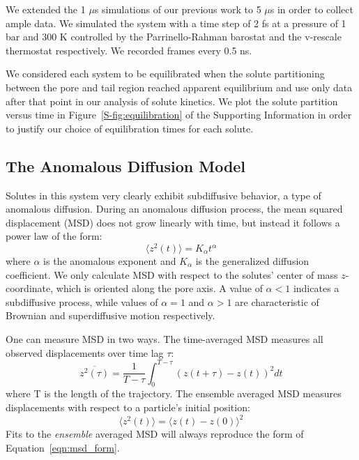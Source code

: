 \documentclass[12pt]{article}
\begin{document}
  We extended the 1 $\mu$s simulations of our previous work to 5 $\mu$s in order
  to collect ample data. We simulated the system with a time step of 2 fs at a pressure
  of 1 bar and 300 K controlled by the Parrinello-Rahman barostat and the v-rescale 
  thermostat respectively. We recorded frames every 0.5 ns.
  
  We considered each system to be equilibrated when the solute partitioning between the 
  pore and tail region reached apparent equilibrium and use only data after that point
  in our analysis of solute kinetics. We plot the solute partition versus time in
  Figure~\ref{S-fig:equilibration} of the Supporting Information in order to justify 
  our choice of equilibration times for each solute.

  \subsection{The Anomalous Diffusion Model}\label{method:model_sFBM}

  Solutes in this system very clearly exhibit subdiffusive behavior, a type of
  anomalous diffusion. During an anomalous diffusion process, the mean squared 
  displacement (MSD) does not grow linearly with time, but instead it follows 
  a power law of the form:
  \begin{equation} 
  \langle z^2(t) \rangle = K_{\alpha}t^{\alpha}
  \label{eqn:msd_form}
  \end{equation} 
  where $\alpha$ is the anomalous exponent and $K_{\alpha}$ is the generalized 
  diffusion coefficient. We only calculate MSD with respect to the solutes' center of
  mass $z$-coordinate, which is oriented along the pore axis. A value of $\alpha < 1$
  indicates a subdiffusive process, while values of $\alpha = 1$ and $\alpha > 1$ 
  are characteristic of Brownian and superdiffusive motion respectively.
  
  
  One can measure MSD in two ways. The time-averaged MSD measures all observed
  displacements over time lag $\tau$: 
  \begin{equation}
  \overline{z^2(\tau)} = \dfrac{1}{T - \tau}\int_{0}^{T - \tau} (z(t + \tau) - z(t))^2 dt
  \end{equation}
  where T is the length of the trajectory. The ensemble averaged MSD measures
  displacements with respect to a particle's initial position:
  \begin{equation}
  \langle z^2(t) \rangle = \langle z(t) - z(0) \rangle^2
  \label{eqn:ensemble_msd}
  \end{equation}
  Fits to the \textit{ensemble} averaged MSD will always reproduce the form of 
  Equation~\ref{eqn:msd_form}.
  
\end{document}
